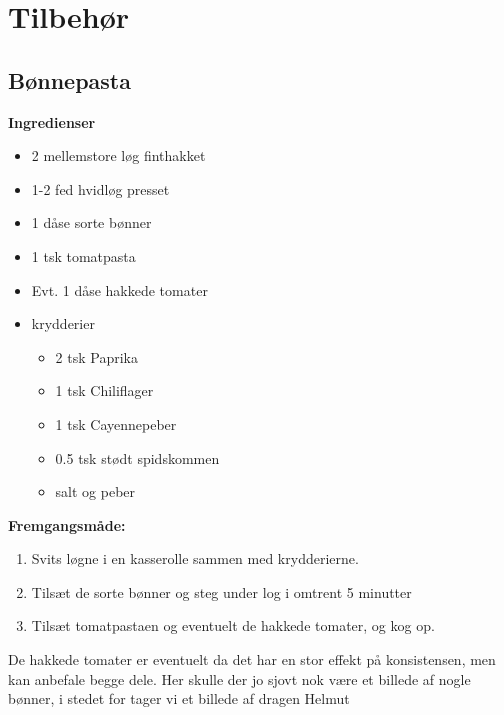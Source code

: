 \documentclass{book}
\begin{document}
\chapter{Tilbehør}
\minitoc
\newpage \section{Bønnepasta}
\begin{minipage}[t]{0.5\textwidth}
\textbf{Ingredienser}
\begin{itemize}
    \item 2 mellemstore løg finthakket
    \item 1-2 fed hvidløg presset
    \item 1 dåse sorte bønner
    \item 1 tsk tomatpasta
    \item Evt. 1 dåse hakkede tomater
    \item krydderier
    \begin{itemize}
        \item 2 tsk Paprika
        \item 1 tsk Chiliflager
        \item 1 tsk Cayennepeber
        \item 0.5 tsk stødt spidskommen
        \item salt og peber
    \end{itemize}
\end{itemize}
\end{minipage}
\begin{minipage}[t]{0.5\textwidth}
\textbf{Fremgangsmåde:}
\begin{enumerate}
    \item Svits løgne i en kasserolle sammen med krydderierne.
    \item Tilsæt de sorte bønner og steg under log i omtrent 5 minutter
    \item Tilsæt tomatpastaen og eventuelt de hakkede tomater, og kog op.
\end{enumerate}
\end{minipage}
De hakkede tomater er eventuelt da det har en stor effekt på konsistensen, men kan anbefale begge dele.
\newpage 
Her skulle der jo sjovt nok være et billede af nogle bønner, i stedet for tager vi et billede af dragen Helmut 
\end{document}
